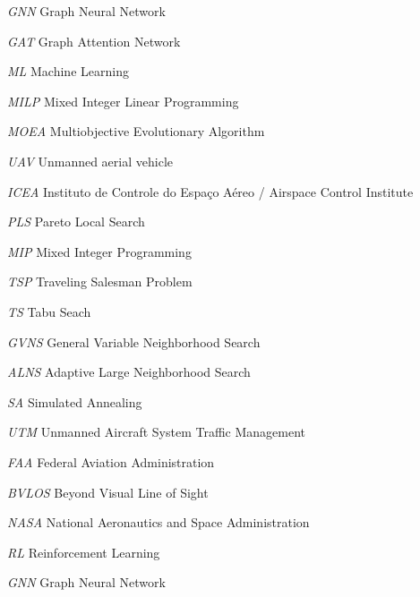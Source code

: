 \begin{siglas}
    \item[\textit{GNN}] Graph Neural Network
    \item[\textit{GAT}] Graph Attention Network
    \item[\textit{ML}] Machine Learning
    \item[\textit{MILP}] Mixed
Integer Linear Programming
    \item[\textit{MOEA}] Multiobjective Evolutionary Algorithm
    \item[\textit{UAV}] Unmanned aerial vehicle
    \item[\textit{ICEA}] Instituto de Controle do Espaço Aéreo / Airspace Control Institute
    \item[\textit{PLS}] Pareto Local Search
    \item [\textit{MIP}] Mixed Integer Programming
    \item [\textit{TSP}] Traveling Salesman Problem
    \item [\textit{TS}] Tabu Seach
    \item [\textit{GVNS}] General Variable Neighborhood Search
    \item [\textit{ALNS}] Adaptive Large Neighborhood Search
    \item [\textit{SA}] Simulated Annealing
    \item[\textit{UTM}] Unmanned
Aircraft System Traffic Management
    \item[\textit{FAA}] Federal Aviation Administration 
    \item[\textit{BVLOS}] Beyond Visual Line of Sight
    \item[\textit{NASA}] National Aeronautics and Space Administration
    \item[\textit{RL}] Reinforcement Learning
    \item[\textit{GNN}] Graph Neural Network
\end{siglas}
